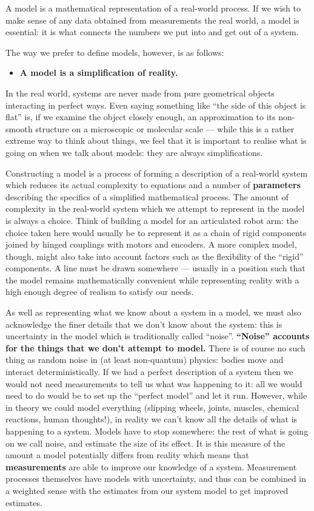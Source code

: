 \documentclass{article}
\begin{document}
A model is a mathematical representation of a real-world process. If
we wish to make sense of any data obtained from measurements the real
world, a model is essential: it is what connects the numbers we put
into and get out of a system.

The way we prefer to define models, however, is as follows:

\begin{itemize}
\item {\bf A model is a simplification of reality.} 
\end{itemize}


In the real world, systems are never made from pure geometrical
objects interacting in perfect ways.  Even saying something like ``the
side of this object is flat'' is, if we examine the object closely
enough, an approximation to its non-smooth structure on a microscopic
or molecular scale --- while this is a rather extreme way to think
about things, we feel that it is important to realise what is going on
when we talk about models: they are always simplifications.

Constructing a model is a process of forming a description of a
real-world system which reduces its actual complexity to equations and
a number of {\bf parameters} describing the specifics of a simplified
mathematical process. The amount of complexity in the real-world
system which we attempt to represent in the model is always a
choice. Think of building a model for an articulated robot arm: the
choice taken here would usually be to represent it as a chain of rigid
components joined by hinged couplings with motors and encoders. A more
complex model, though, might also take into account factors such as
the flexibility of the ``rigid'' components. A line must be drawn
somewhere --- usually in a position such that the model remains
mathematically convenient while representing reality with a high
enough degree of realism to satisfy our needs.

As well as representing what we know about a system in a model, we
must also acknowledge the finer details that we don't know about the
system: this is uncertainty in the model which is traditionally called
``noise''. {\bf ``Noise'' accounts for the things that we don't
  attempt to model.} There is of course no such thing as random noise
in (at least non-quantum) physics: bodies move and interact
deterministically. If we had a perfect description of a system then we
would not need measurements to tell us what was happening to it: all
we would need to do would be to set up the ``perfect model'' and let
it run.  However, while in theory we could model everything (slipping
wheels, joints, muscles, chemical reactions, human thoughts!), in
reality we can't know all the details of what is happening to a
system. Models have to stop somewhere: the rest of what is going on we
call noise, and estimate the size of its effect. It is this measure of
the amount a model potentially differs from reality which means that
{\bf measurements} are able to improve our knowledge of a
system. Measurement processes themselves have models with uncertainty,
and thus can be combined in a weighted sense with the estimates from
our system model to get improved estimates.
\end{document}
